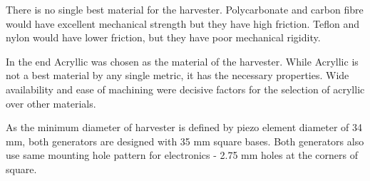 \begin{table}[htb]
\caption{\label{parameters_of_materials} Materials for the shaft of generator \cite{PlasticsInternational2015}, \cite{Etra}, \cite{Goodfellow} \cite{McCarr}.}
\begin{center}

\end{center}
\end{table}

There is no single best material for the harvester. Polycarbonate and carbon fibre would have excellent mechanical strength but they have high friction. Teflon and nylon would have lower friction, but they have poor mechanical rigidity. 

In the end Acryllic was chosen as the material of the harvester. While Acryllic is not a best material by any single metric, it has the necessary properties. Wide availability and ease of machining were decisive factors for the selection of acryllic over other materials. 

As the minimum diameter of harvester is defined by piezo element diameter of 34 mm, both generators are designed with 35 mm square bases. Both generators also use same mounting hole pattern for electronics - 2.75 mm holes at the corners of square.

